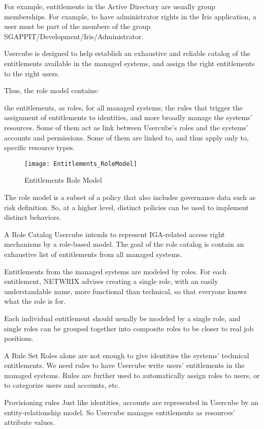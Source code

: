 For example, entitlements in the Active Directory are usually group memberships. For example, to have administrator rights in the Iris application, a user must be part of the members of the group SGAPPIT/Development/Iris/Administrator.

Usercube is designed to help establish an exhaustive and reliable catalog of the entitlements available in the managed systems, and assign the right entitlements to the right users.

Thus, the role model contains:

the entitlements, as roles, for all managed systems;
the rules that trigger the assignment of entitlements to identities, and more broadly manage the systems' resources. Some of them act as link between Usercube's roles and the systems' accounts and permissions. Some of them are linked to, and thus apply only to, specific resource types.

\begin{figure}[htbp]
  \centering
  \texttt{[image: Entitlements\_RoleModel]}
  \caption{Entitlements Role Model}
  \label{fig:configurationCycle}
\end{figure}

The role model is a subset of a policy that also includes governance data such as risk definition. So, at a higher level, distinct policies can be used to implement distinct behaviors.

A Role Catalog
Usercube intends to represent IGA-related access right mechanisms by a role-based model. The goal of the role catalog is contain an exhaustive list of entitlements from all managed systems.

Entitlements from the managed systems are modeled by roles. For each entitlement, NETWRIX advises creating a single role, with an easily understandable name, more functional than technical, so that everyone knows what the role is for.

Each individual entitlement should usually be modeled by a single role, and single roles can be grouped together into composite roles to be closer to real job positions.

A Rule Set
Roles alone are not enough to give identities the systems' technical entitlements. We need rules to have Usercube write users' entitlements in the managed systems. Rules are further used to automatically assign roles to users, or to categorize users and accounts, etc.

Provisioning rules
Just like identities, accounts are represented in Usercube by an entity-relationship model. So Usercube manages entitlements as resources' attribute values.


